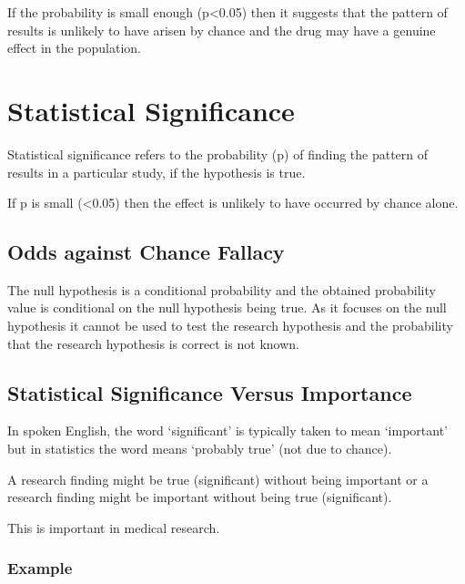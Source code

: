 \documentclass[
]{book}
\begin{document}
If the probability is small enough (p\textless0.05) then it suggests that the pattern of results is unlikely to have arisen by chance and the drug may have a genuine effect in the population.

\hypertarget{statistical-significance}{%
\section{Statistical Significance}\label{statistical-significance}}

Statistical significance refers to the probability (p) of finding the pattern of results in a particular study, if the hypothesis is true.

If p is small (\textless0.05) then the effect is unlikely to have occurred by chance alone.

\hypertarget{odds-against-chance-fallacy}{%
\subsection{Odds against Chance Fallacy}\label{odds-against-chance-fallacy}}

The null hypothesis is a conditional probability and the obtained probability value is conditional on the null hypothesis being true. As it focuses on the null hypothesis it cannot be used to test the research hypothesis and the probability that the research hypothesis is correct is not known.

\hypertarget{statistical-significance-versus-importance}{%
\subsection{Statistical Significance Versus Importance}\label{statistical-significance-versus-importance}}

In spoken English, the word `significant' is typically taken to mean `important' but in statistics the word means `probably true' (not due to chance).

A research finding might be true (significant) without being important or a research finding might be important without being true (significant).

This is important in medical research.

\hypertarget{example-17}{%
\subsubsection{Example}\label{example-17}}
\end{document}
